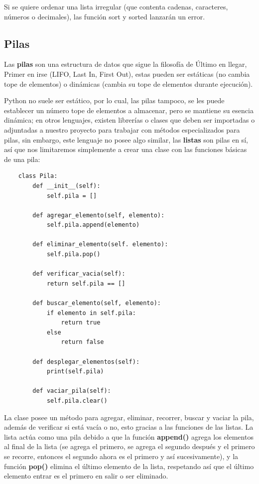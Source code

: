 Si se quiere ordenar una lista irregular (que contenta cadenas, caracteres, números o decimales), las función sort y sorted lanzarán un error.


\subsection{Pilas}
\hspace{0.55cm}Las \textbf{pilas} son una estructura de datos que sigue la filosofía de Último en llegar, Primer en irse (LIFO, Last In, First Out), estas pueden ser estáticas (no cambia tope de elementos) o dinámicas (cambia su tope de elementos durante ejecución).

Python no suele ser estático, por lo cual, las pilas tampoco, se les puede establecer un número tope de elementos a almacenar, pero se mantiene su esencia dinámica; en otros lenguajes, existen librerías o clases que deben ser importadas o adjuntadas a nuestro proyecto para trabajar con métodos especializados para pilas, sin embargo, este lenguaje no posee algo similar, las \textbf{listas} son pilas en sí, así que nos limitaremos simplemente a crear una clase con las funciones básicas de una pila:
\begin{lstlisting}
	class Pila:
		def __init__(self):
			self.pila = []
			
		def agregar_elemento(self, elemento):
			self.pila.append(elemento)
			
		def eliminar_elemento(self. elemento):
			self.pila.pop()
			
		def verificar_vacia(self):
			return self.pila == []
			
		def buscar_elemento(self, elemento):
			if elemento in self.pila:
				return true
			else
				return false
				
		def desplegar_elementos(self):
			print(self.pila)
			
		def vaciar_pila(self):
			self.pila.clear()
\end{lstlisting}

La clase posee un método para agregar, eliminar, recorrer, buscar y vaciar la pila, además de verificar si está vacía o no, esto gracias a las funciones de las listas. La lista actúa como una pila debido a que la función \textbf{append()} agrega los elementos al final de la lista (se agrega el primero, se agrega el segundo después y el primero se recorre, entonces el segundo ahora es el primero y así sucesivamente), y la función \textbf{pop()} elimina el último elemento de la lista, respetando así que el último elemento entrar es el primero en salir o ser eliminado.


